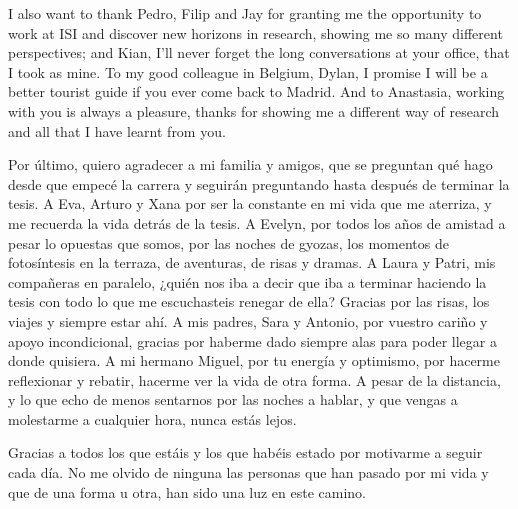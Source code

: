 I also want to thank Pedro, Filip and Jay for granting me the opportunity to work at ISI and discover new horizons in research, showing me so many different perspectives; and Kian, I'll never forget the long conversations at your office, that I took as mine. 
To my good colleague in Belgium, Dylan, I promise I will be a better tourist guide if you ever come back to Madrid. 
And to Anastasia, working with you is always a pleasure, thanks for showing me a different way of research and all that I have learnt from you.

Por último, quiero agradecer a mi familia y amigos, que se preguntan qué hago desde que empecé la carrera y seguirán preguntando hasta después de terminar la tesis. 
A Eva, Arturo y Xana por ser la constante en mi vida que me aterriza, y me recuerda la vida detrás de la tesis. 
A Evelyn, por todos los años de amistad a pesar lo opuestas que somos, por las noches de gyozas, los momentos de fotosíntesis en la terraza, de aventuras, de risas y dramas. 
A Laura y Patri, mis compañeras en paralelo, ¿quién nos iba a decir que iba a terminar haciendo la tesis con todo lo que me escuchasteis renegar de ella? Gracias por las risas, los viajes y siempre estar ahí. 
A mis padres, Sara y Antonio, por vuestro cariño y apoyo incondicional, gracias por haberme dado siempre alas para poder llegar a donde quisiera. 
A mi hermano Miguel, por tu energía y optimismo, por hacerme reflexionar y rebatir, hacerme ver la vida de otra forma. 
A pesar de la distancia, y lo que echo de menos sentarnos por las noches a hablar, y que vengas a molestarme a cualquier hora, nunca estás lejos. 

Gracias a todos los que estáis y los que habéis estado por motivarme a seguir cada día. 
No me olvido de ninguna las personas que han pasado por mi vida y que de una forma u otra, han sido una luz en este camino. 




